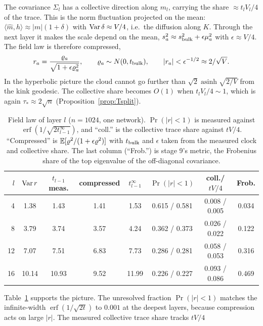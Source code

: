 \begin{proposition}\label{prop:collective}
The covariance $\Sigma_l$ has a collective direction along $m_l$, carrying the share $\approx t_lV_l/4$ of the trace. This is the norm
fluctuation projected on the mean: $\langle\hat m,h\rangle\approx|m|(1+\delta)$ with $\operatorname{Var}\delta\approx V/4$, i.e.\ the diffusion along $K$.
Through the next layer it makes the scale depend on the mean, $s_a^2\approx s_{\rm bulk}^2+\epsilon\mu_a^2$ with $\epsilon\approx V/4$. The
field law is therefore compressed,
\[
r_a=\frac{\varrho_a}{\sqrt{1+\epsilon\varrho_a^2}},\qquad \varrho_a\sim N(0,t_{\rm bulk}),\qquad |r_a|<\epsilon^{-1/2}\approx2/\sqrt V .
\]
In the hyperbolic picture the cloud cannot go further than $\sqrt2\operatorname{asinh}\sqrt{2/V}$ from the kink geodesic. The collective
share becomes $O(1)$ when $t_lV_l/4\sim1$, which is again $\tau_*\approx2\sqrt n$ (Proposition~\ref{prop:Tsplit}).
\end{proposition}
\begin{table}[h]\centering\small
\begin{tabular}{rccccccc}\toprule
$l$ & $\operatorname{Var} r$ & $t_{l-1}$ meas. & compressed & $t_{l-1}^\infty$ & $\Pr(|r|<1)$ & coll./$tV/4$ & Frob.\\\midrule
4 & 1.38 & 1.43 & 1.41 & 1.53 & 0.615 / 0.581 & 0.008 / 0.005 & 0.034\\
8 & 3.79 & 3.74 & 3.57 & 4.24 & 0.362 / 0.373 & 0.026 / 0.022 & 0.122\\
12 & 7.07 & 7.51 & 6.83 & 7.73 & 0.286 / 0.281 & 0.058 / 0.053 & 0.316\\
16 & 10.14 & 10.93 & 9.52 & 11.99 & 0.226 / 0.227 & 0.093 / 0.086 & 0.469\\
\bottomrule\end{tabular}
\caption{Field law of layer $l$ ($n=1024$, one network). $\Pr(|r|<1)$ is measured against $\operatorname{erf}(1/\sqrt{2t^\infty_{l-1}})$, and
``coll.'' is the collective trace share against $tV/4$. ``Compressed'' is $\mathbb E[\varrho^2/(1+\epsilon\varrho^2)]$ with $t_{\rm bulk}$ and $\epsilon$ taken from the
measured clock and collective share. The last column (``Frob.'') is stage 9's metric, the Frobenius share of the top eigenvalue of the
off-diagonal covariance.}\label{tab:fields}
\end{table}
Table~\ref{tab:fields} supports the picture. The unresolved fraction $\Pr(|r|<1)$ matches the infinite-width $\operatorname{erf}(1/\sqrt{2t})$ to
$0.001$ at the deepest layers, because compression acts on large $|r|$. The measured collective trace share tracks $tV/4$
